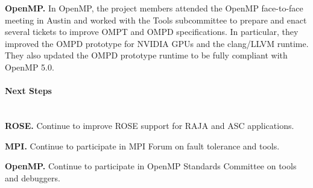 \textbf{OpenMP.} In OpenMP, 
the project members attended the OpenMP 
face-to-face meeting in Austin and worked with the Tools subcommittee 
to prepare and enact several tickets to improve OMPT and OMPD 
specifications. In particular, they improved the OMPD prototype for
NVIDIA GPUs and the clang/LLVM runtime. They also updated the OMPD
prototype runtime to be fully compliant with OpenMP 5.0.


\paragraph{Next Steps}  \leavevmode \\


\textbf{ROSE.} Continue to improve ROSE support for RAJA and ASC applications.

\textbf{MPI.} Continue to participate in MPI Forum on fault tolerance and
tools.

\textbf{OpenMP.} Continue to participate in OpenMP Standards Committee
on tools and debuggers.
